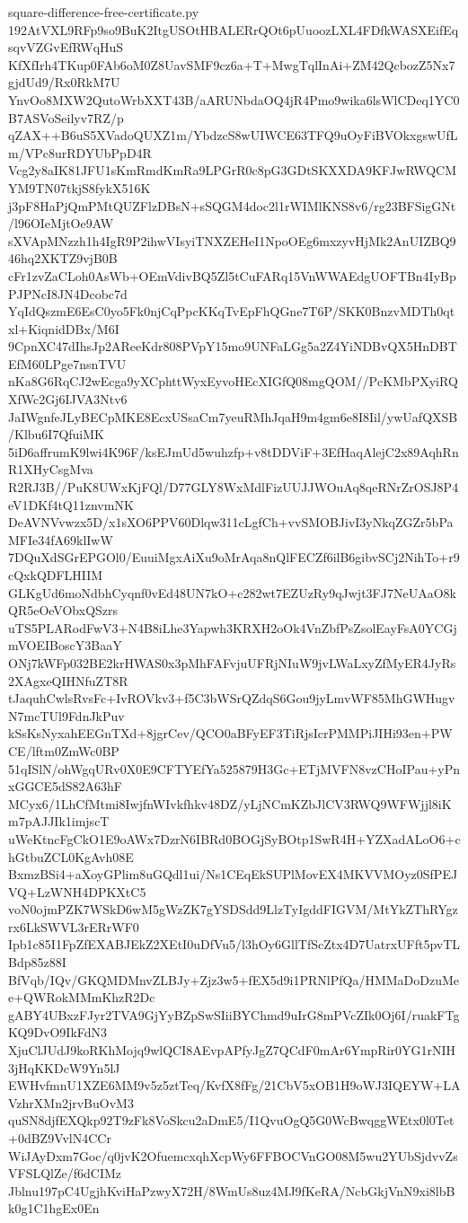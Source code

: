 \documentclass[11pt]{article}
\theoremstyle{definition}
\theoremstyle{remark}
\begin{document}
\begin{filecontents*}[overwrite]{square-difference-free-certificate.py}
192AtVXL9RFp9so9BuK2ItgUSOtHBALERrQOt6pUuoozLXL4FDfkWASXEifEqsqvVZGvEfRWqHuS
KfXfIrh4TKup0FAb6oM0Z8UavSMF9cz6a+T+MwgTqlInAi+ZM42QcbozZ5Nx7gjdUd9/Rx0RkM7U
YnvOo8MXW2QutoWrbXXT43B/aARUNbdaOQ4jR4Pmo9wika6lsWlCDeq1YC0B7ASVoSeilyv7RZ/p
qZAX++B6uS5XVadoQUXZ1m/YbdzcS8wUIWCE63TFQ9uOyFiBVOkxgswUfLm/VPc8urRDYUbPpD4R
Vcg2y8aIK81JFU1sKmRmdKmRa9LPGrR0c8pG3GDtSKXXDA9KFJwRWQCMYM9TN07tkjS8fykX516K
j3pF8HaPjQmPMtQUZFlzDBsN+sSQGM4doc2l1rWIMlKNS8v6/rg23BFSigGNt/l96OIeMjtOe9AW
sXVApMNzzh1h4IgR9P2ihwVIsyiTNXZEHeI1NpoOEg6mxzyvHjMk2AnUIZBQ946hq2XKTZ9vjB0B
cFr1zvZaCLoh0AsWb+OEmVdivBQ5Zl5tCuFARq15VnWWAEdgUOFTBn4IyBpPJPNcI8JN4Dcobc7d
YqIdQszmE6EsC0yo5Fk0njCqPpcKKqTvEpFhQGne7T6P/SKK0BnzvMDTh0qtxl+KiqnidDBx/M6I
9CpnXC47dIhsJp2AReeKdr808PVpY15mo9UNFaLGg5a2Z4YiNDBvQX5HnDBTEfM60LPge7nsnTVU
nKa8G6RqCJ2wEcga9yXCphttWyxEyvoHEcXIGfQ08mgQOM//PcKMbPXyiRQXfWc2Gj6IJVA3Ntv6
JaIWgnfeJLyBECpMKE8EcxUSsaCm7yeuRMhJqaH9m4gm6e8I8Iil/ywUafQXSB/Klbu6I7QfuiMK
5iD6affrumK9lwi4K96F/ksEJmUd5wuhzfp+v8tDDViF+3EfHaqAlejC2x89AqhRnR1XHyCsgMva
R2RJ3B//PuK8UWxKjFQl/D77GLY8WxMdlFizUUJJWOuAq8qeRNrZrOSJ8P4eV1DKf4tQ11znvmNK
DeAVNVvwzx5D/x1sXO6PPV60Dlqw311cLgfCh+vvSMOBJivI3yNkqZGZr5bPaMFIe34fA69klIwW
7DQuXdSGrEPGOl0/EuuiMgxAiXu9oMrAqa8nQlFECZf6ilB6gibvSCj2NihTo+r9cQxkQDFLHIIM
GLKgUd6moNdbhCyqnf0vEd48UN7kO+c282wt7EZUzRy9qJwjt3FJ7NeUAaO8kQR5eOeVObxQSzrs
uTS5PLARodFwV3+N4B8iLhe3Yapwh3KRXH2oOk4VnZbfPsZsolEayFsA0YCGjmVOEIBoscY3BaaY
ONj7kWFp032BE2krHWAS0x3pMhFAFvjuUFRjNIuW9jvLWaLxyZfMyER4JyRs2XAgxeQIHNfuZT8R
tJaquhCwlsRvsFc+IvROVkv3+f5C3bWSrQZdqS6Gou9jyLmvWF85MhGWHugvN7mcTUl9FdnJkPuv
kSsKsNyxahEEGnTXd+8jgrCev/QCO0aBFyEF3TiRjsIcrPMMPiJIHi93en+PWCE/lftm0ZmWc0BP
51qISlN/ohWgqURv0X0E9CFTYEfYa525879H3Gc+ETjMVFN8vzCHoIPau+yPnxGGCE5dS82A63hF
MCyx6/1LhCfMtmi8IwjfnWIvkfhkv48DZ/yLjNCmKZbJlCV3RWQ9WFWjjl8iKm7pAJJIk1imjscT
uWeKtncFgCkO1E9oAWx7DzrN6IBRd0BOGjSyBOtp1SwR4H+YZXadALoO6+chGtbuZCL0KgAvh08E
BxmzBSi4+aXoyGPlim8uGQdl1ui/Ns1CEqEkSUPlMovEX4MKVVMOyz0SfPEJVQ+LzWNH4DPKXtC5
voN0ojmPZK7WSkD6wM5gWzZK7gYSDSdd9LlzTyIgddFIGVM/MtYkZThRYgzrx6LkSWVL3rERrWF0
Ipb1c85I1FpZfEXABJEkZ2XEtI0uDfVu5/l3hOy6GllTfScZtx4D7UatrxUFft5pvTLBdp85z88I
BfVqb/IQv/GKQMDMnvZLBJy+Zjz3w5+fEX5d9i1PRNlPfQa/HMMaDoDzuMee+QWRokMMmKhzR2Dc
gABY4UBxzFJyr2TVA9GjYyBZpSwSIiiBYChmd9uIrG8mPVcZIk0Oj6I/ruakFTgKQ9DvO9IkFdN3
XjuClJUdJ9koRKhMojq9wlQCI8AEvpAPfyJgZ7QCdF0mAr6YmpRir0YG1rNIH3jHqKKDcW9Yn5lJ
EWHvfmnU1XZE6MM9v5z5ztTeq/KvfX8fFg/21CbV5xOB1H9oWJ3IQEYW+LAVzhrXMn2jrvBuOvM3
quSN8djfEXQkp92T9zFk8VoSkcu2aDmE5/I1QvuOgQ5G0WcBwqggWEtx0l0Tet+0dBZ9VvlN4CCr
WiJAyDxm7Goc/q0jvK2OfuemcxqhXcpWy6FFBOCVnGO08M5wu2YUbSjdvvZsVFSLQlZe/f6dCIMz
Jblnu197pC4UgjhKviHaPzwyX72H/8WmUs8uz4MJ9fKeRA/NcbGkjVnN9xi8lbBk0g1C1hgEx0En

\end{filecontents*}
\end{document}
